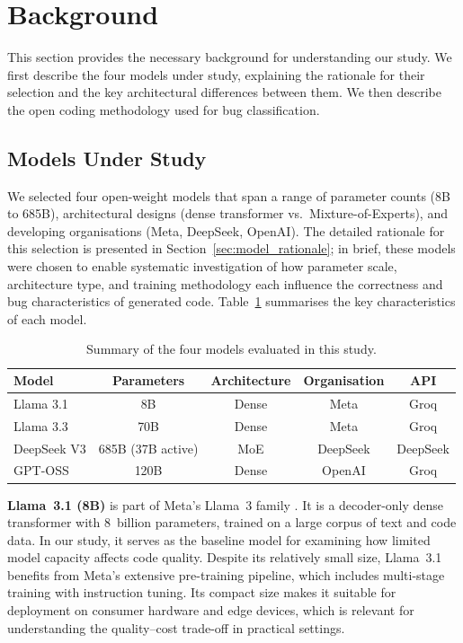 \documentclass[smallextended]{svjour3}
\begin{document}
\section{Background}
\label{sec:background}

This section provides the necessary background for understanding our study. We first describe the four models under study, explaining the rationale for their selection and the key architectural differences between them. We then describe the open coding methodology used for bug classification.

\subsection{Models Under Study}
\label{sec:models}

We selected four open-weight models that span a range of parameter counts (8B to 685B), architectural designs (dense transformer vs.\ Mixture-of-Experts), and developing organisations (Meta, DeepSeek, OpenAI). The detailed rationale for this selection is presented in Section~\ref{sec:model_rationale}; in brief, these models were chosen to enable systematic investigation of how parameter scale, architecture type, and training methodology each influence the correctness and bug characteristics of generated code. Table~\ref{tab:models} summarises the key characteristics of each model.

\begin{table}[t]
\centering
\caption{Summary of the four models evaluated in this study.}
\label{tab:models}
\begin{tabular}{lcccc}
\toprule
Model & Parameters & Architecture & Organisation & API \\
\midrule
Llama 3.1 & 8B & Dense & Meta & Groq \\
Llama 3.3 & 70B & Dense & Meta & Groq \\
DeepSeek V3 & 685B (37B active) & MoE & DeepSeek & DeepSeek \\
GPT-OSS & 120B & Dense & OpenAI & Groq \\
\bottomrule
\end{tabular}
\end{table}

\textbf{Llama~3.1 (8B)} is part of Meta's Llama~3 family \citep{touvron2023llama}. It is a decoder-only dense transformer with 8~billion parameters, trained on a large corpus of text and code data. In our study, it serves as the baseline model for examining how limited model capacity affects code quality. Despite its relatively small size, Llama~3.1 benefits from Meta's extensive pre-training pipeline, which includes multi-stage training with instruction tuning. Its compact size makes it suitable for deployment on consumer hardware and edge devices, which is relevant for understanding the quality--cost trade-off in practical settings.
\end{document}
